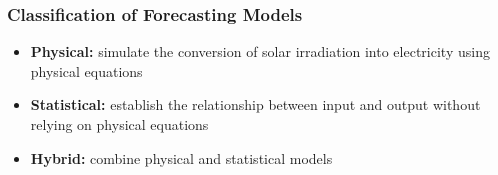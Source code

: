 \begin{frame}
    \frametitle{Classification of Forecasting Models}
    \begin{itemize}
        \item \textbf{Physical:} simulate the conversion of solar irradiation into electricity using physical equations
        \item \textbf{Statistical:} establish the relationship between input and output without relying on physical equations
        \item \textbf{Hybrid:} combine physical and statistical models
    \end{itemize}
\end{frame}